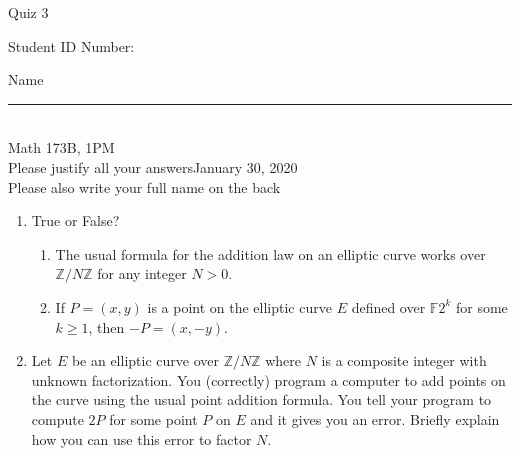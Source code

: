 \documentclass[12pt]{article}
\newcommand{\integers}{\mathbb{Z}}
\newcommand{\field}{\mathbb{F}}
\begin{document}
\begin{flushleft} 
\centerline{\LARGE{Quiz 3}} 
\vspace{5 mm}
{Student ID Number:}\hfill  
{Name \rule {2 in}{0.01in}}\\
Math 173B, 1PM
\\
{Please justify all your answers}\hfill {January 30, 2020}
\\
{Please also write your full name on the back} 

\medskip
\end{flushleft}

\begin{enumerate}
	\item True or False?
	\begin{enumerate}
		\item The usual formula for the addition law on an elliptic curve works over $\integers/N \integers$ for any integer $N>0$.
		\item If $P = (x, y)$ is a point on the elliptic curve $E$ defined over $\field{2^k}$ for some $k\geq 1$, then $-P = (x, -y)$.
	\end{enumerate}

	\item Let $E$ be an elliptic curve over $\integers/N \integers$ where $N$ is a composite integer with unknown factorization. You (correctly) program a computer to add points on the curve using the usual point addition formula. You tell your program to compute $2P$ for some point $P$ on $E$ and it gives you an error. Briefly explain how you can use this error to factor $N$.
	\vfill
\end{enumerate}

\end{document}

